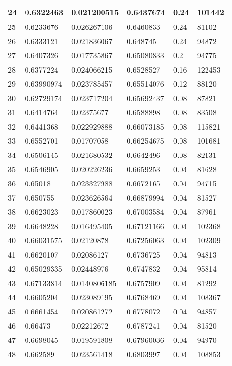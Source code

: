 \begin{longtable}{|l|l|l|l|l|l|}
24 & 0.6322463 & 0.021200515 & 0.6437674 & 0.24 & 101442 \\ \hline 
25 & 0.6233676 & 0.026267106 & 0.6460833 & 0.24 & 81102 \\ \hline 
26 & 0.6333121 & 0.021836067 & 0.648745 & 0.24 & 94872 \\ \hline 
27 & 0.6407326 & 0.017735867 & 0.65080833 & 0.2 & 94775 \\ \hline 
28 & 0.6377224 & 0.024066215 & 0.6528527 & 0.16 & 122453 \\ \hline 
29 & 0.63990974 & 0.023785457 & 0.65514076 & 0.12 & 88120 \\ \hline 
30 & 0.62729174 & 0.023717204 & 0.65692437 & 0.08 & 87821 \\ \hline 
31 & 0.6414764 & 0.02375677 & 0.6588898 & 0.08 & 83508 \\ \hline 
32 & 0.6441368 & 0.022929888 & 0.66073185 & 0.08 & 115821 \\ \hline 
33 & 0.6552701 & 0.01707058 & 0.66254675 & 0.08 & 101681 \\ \hline 
34 & 0.6506145 & 0.021680532 & 0.6642496 & 0.08 & 82131 \\ \hline 
35 & 0.6546905 & 0.020226236 & 0.6659253 & 0.04 & 81628 \\ \hline 
36 & 0.65018 & 0.023327988 & 0.6672165 & 0.04 & 94715 \\ \hline 
37 & 0.650755 & 0.023626564 & 0.66879994 & 0.04 & 81527 \\ \hline 
38 & 0.6623023 & 0.017860023 & 0.67003584 & 0.04 & 87961 \\ \hline 
39 & 0.6648228 & 0.016495405 & 0.67121166 & 0.04 & 102368 \\ \hline 
40 & 0.66031575 & 0.02120878 & 0.67256063 & 0.04 & 102309 \\ \hline 
41 & 0.6620107 & 0.02086127 & 0.6736725 & 0.04 & 94813 \\ \hline 
42 & 0.65029335 & 0.02448976 & 0.6747832 & 0.04 & 95814 \\ \hline 
43 & 0.67133814 & 0.0140806185 & 0.6757909 & 0.04 & 81292 \\ \hline 
44 & 0.6605204 & 0.023089195 & 0.6768469 & 0.04 & 108367 \\ \hline 
45 & 0.6661454 & 0.020861272 & 0.6778072 & 0.04 & 94857 \\ \hline 
46 & 0.66473 & 0.02212672 & 0.6787241 & 0.04 & 81520 \\ \hline 
47 & 0.6698045 & 0.019591808 & 0.67960036 & 0.04 & 94970 \\ \hline 
48 & 0.662589 & 0.023561418 & 0.6803997 & 0.04 & 108853 \\ \hline 

\end{longtable}
